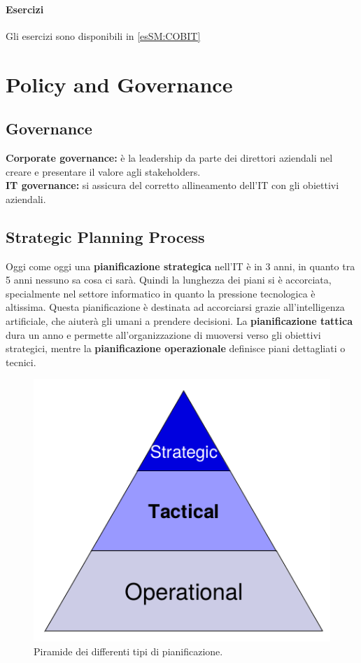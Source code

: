 \subsubsection{Esercizi}

Gli esercizi sono disponibili in \ref{esSM:COBIT}

\chapter{Policy and Governance}
\label{PG}

\section{Governance}

\textbf{Corporate governance:} è la leadership da parte dei direttori
aziendali nel creare e presentare il valore agli stakeholders.\\
\newline
\textbf{IT governance:} si assicura del corretto allineamento dell'IT con gli
obiettivi aziendali.



\section{Strategic Planning Process}
\label{PG:SPP}

Oggi come oggi una \textbf{pianificazione strategica} nell'IT è in 3 anni, in
quanto tra 5 anni nessuno sa cosa ci sarà. Quindi la lunghezza dei piani si è
accorciata, specialmente nel settore informatico in quanto la pressione
tecnologica è altissima. Questa pianificazione è destinata ad accorciarsi
grazie all'intelligenza artificiale, che aiuterà gli umani a prendere
decisioni. La \textbf{pianificazione tattica} dura un anno e permette
all'organizzazione di muoversi verso gli obiettivi strategici, mentre la
\textbf{pianificazione operazionale} definisce piani dettagliati o tecnici.

\begin{figure}[H]
        \begin{center}
                \includegraphics[scale=0.4]{res/img/planning_process}
        \end{center}
        \caption{Piramide dei differenti tipi di pianificazione.}
\end{figure}

